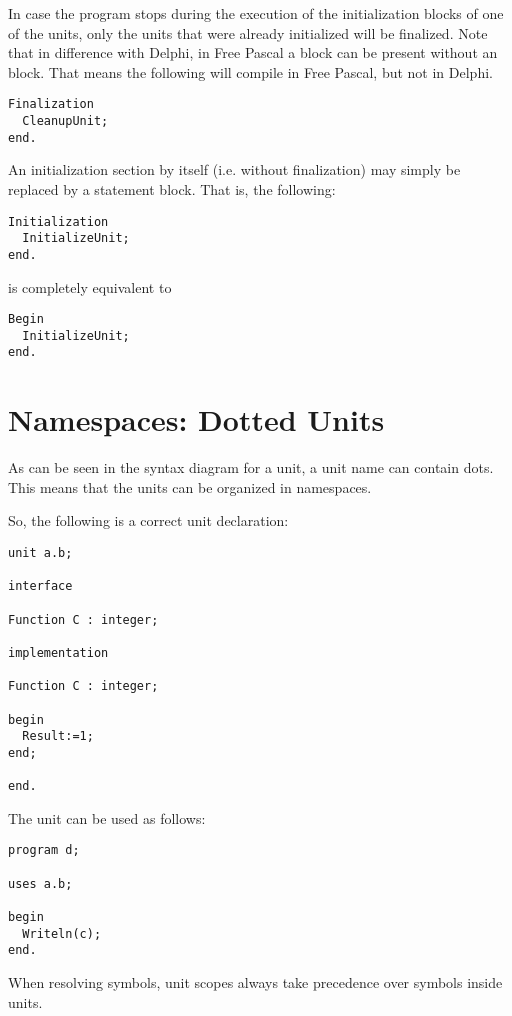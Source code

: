 In case the program stops during the execution of the initialization blocks
of one of the units, only the units that were already initialized will be
finalized.
Note that in difference with Delphi, in Free Pascal a  block can be 
present without an  block. That means the following will
compile in Free Pascal, but not in Delphi.
\begin{verbatim}
Finalization
  CleanupUnit;
end.
\end{verbatim}
An initialization section by itself (i.e. without finalization) may simply be 
replaced by a statement block. That is, the following:
\begin{verbatim}
Initialization
  InitializeUnit;
end.
\end{verbatim}
is completely equivalent to
\begin{verbatim}
Begin
  InitializeUnit;
end.
\end{verbatim}

\section{Namespaces: Dotted Units}
As can be seen in the syntax diagram for a unit, a unit name can contain dots.
This means that the units can be organized in namespaces.

So, the following is a correct unit declaration:
\begin{verbatim}
unit a.b;

interface 

Function C : integer;

implementation

Function C : integer;

begin
  Result:=1;
end;

end.
\end{verbatim}
The unit can be used as follows:
\begin{verbatim}
program d;

uses a.b;

begin
  Writeln(c);
end.
\end{verbatim}
When resolving symbols, unit scopes always take precedence over symbols inside units.

